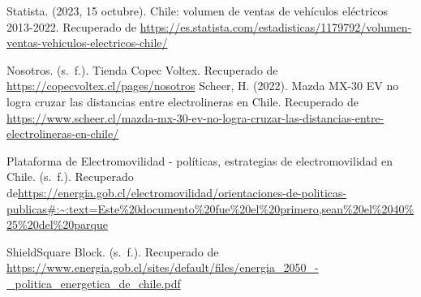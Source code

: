 \documentclass[letterpaper]{article}
\begin{document}
\begin{flushleft}
	
	\begin{thebibliography}{9}
	Statista. (2023, 15 octubre). Chile: volumen de ventas de vehículos eléctricos 2013-2022. Recuperado de \url{https://es.statista.com/estadisticas/1179792/volumen-ventas-vehiculos-electricos-chile/}

	Nosotros. (s. f.). Tienda Copec Voltex. Recuperado de \url{https://copecvoltex.cl/pages/nosotros}
	Scheer, H. (2022). Mazda MX-30 EV no logra cruzar las distancias entre electrolineras en Chile. Recuperado de \url{https://www.scheer.cl/mazda-mx-30-ev-no-logra-cruzar-las-distancias-entre-electrolineras-en-chile/}

	Plataforma de Electromovilidad - políticas, estrategias de electromovilidad en Chile. (s. f.). Recuperado de\url{https://energia.gob.cl/electromovilidad/orientaciones-de-politicas-publicas#:~:text=Este%20documento%20fue%20el%20primero,sean%20el%2040%25%20del%20parque}
	
	ShieldSquare Block. (s. f.). Recuperado de \url{https://www.energia.gob.cl/sites/default/files/energia_2050_-_politica_energetica_de_chile.pdf}


	\end{thebibliography}

	\end{flushleft}
\end{document}
